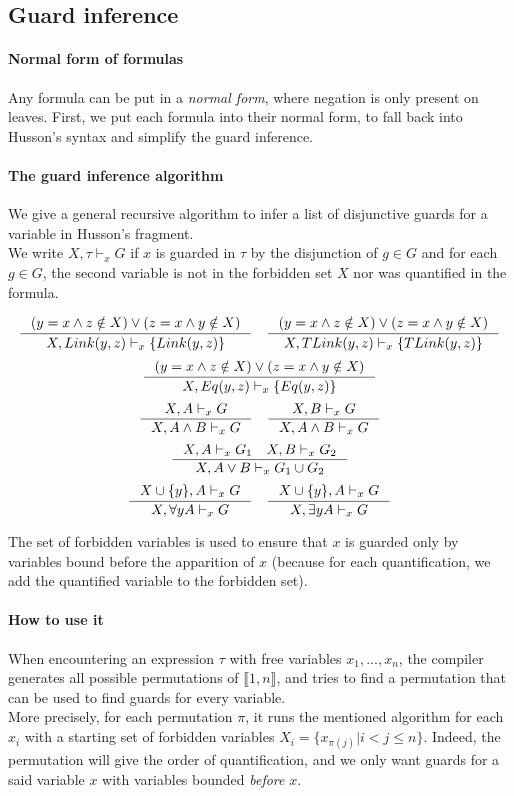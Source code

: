 \documentclass[10pt,a4paper]{article}
\begin{document}
\subsection{Guard inference}
\label{subsec:guardinfer}

\paragraph{Normal form of formulas}
Any formula can be put in a \emph{normal form}, where negation is only present on leaves. First, we put each formula into their normal form, to fall back into Husson's syntax and simplify the guard inference.

\paragraph{The guard inference algorithm}
We give a general recursive algorithm to infer a list of disjunctive guards for a variable in Husson's fragment.\\
We write $X,\tau \vdash_x G$ if $x$ is guarded in $\tau$ by the disjunction of $g\in G$ and for each $g\in G$, the second variable is not in the forbidden set $X$ nor was quantified in the formula.

\[\inference{(y=x \land z \notin X) \lor (z=x \land y \notin X)}{X, Link(y,z) \vdash_x \{ Link(y,z) \}}  \quad \inference{(y=x \land z \notin X) \lor (z=x \land y \notin X)}{X, TLink(y,z) \vdash_x \{ TLink(y,z)\}}\]
\[\inference{(y=x \land z \notin X) \lor (z=x \land y \notin X)}{X, Eq(y,z) \vdash_x \{ Eq(y,z) \}}\]
\[\inference{X,A \vdash_x G }{X, A\land B \vdash_x G} \quad \inference{X,B \vdash_x G }{X, A\land B \vdash_x G}\]
\[\inference{X,A \vdash_x G_1  \quad X,B \vdash_x G_2}
  {X, A\lor B \vdash_x G_1 \cup G_2}\]
\[\inference{X\cup \{y\},A \vdash_x G }{X, \forall y A \vdash_x G} \quad
\inference{X\cup \{y\},A \vdash_x G }{X, \exists y A \vdash_x G}\]

The set of forbidden variables is used to ensure that $x$ is guarded only by variables bound before the apparition of $x$ (because for each quantification, we add the quantified variable to the forbidden set).

\paragraph{How to use it}
When encountering an expression $\tau$ with free variables $x_1,...,x_n$, the compiler generates all possible permutations of $\llbracket 1,n \rrbracket$, and tries to find a permutation that can be used to find guards for every variable.\\
More precisely, for each permutation $\pi$, it runs the mentioned algorithm for each $x_i$ with a starting set of forbidden variables $X_i = \{x_{\pi(j)} | i<j\le n\}$. Indeed, the permutation will give the order of quantification, and we only want guards for a said variable $x$ with variables bounded \emph{before} $x$.
\end{document}
